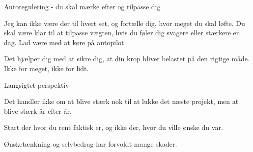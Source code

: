 \begin{multicols}{2}
  \begin{tList}{Autoregulering - du skal mærke efter og tilpasse dig}

  \item Jeg kan ikke være der til hvert set, og fortælle dig, hvor
    meget du skal løfte. Du skal være klar til at tilpasse vægten,
    hvis du føler dig svagere eller stærkere en dag. Lad være med at
    køre på autopilot.

  \item Det hjælper dig med at sikre dig, at din krop bliver belastet
    på den rigtige måde. Ikke for meget, ikke for lidt.
  \end{tList}

  \begin{tList}{Langsigtet perspektiv}

  \item Det handler ikke om at blive stærk nok til at lukke det næste
    projekt, men at blive stærk år efter år.
  \item Start der hvor du rent faktisk er, og ikke der, hvor du ville
    ønske du var.

  \item Ønsketænkning og selvbedrag har forvoldt mange skader.
  \end{tList}

\end{multicols}
